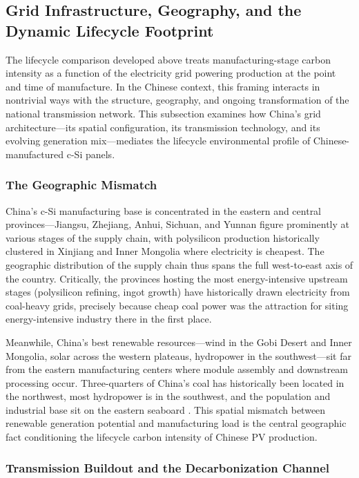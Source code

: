 \documentclass{article}
\begin{document}
\subsection{Grid Infrastructure, Geography, and the Dynamic Lifecycle Footprint}
 
The lifecycle comparison developed above treats manufacturing-stage carbon intensity as a function of the electricity grid powering production at the point and time of manufacture. In the Chinese context, this framing interacts in nontrivial ways with the structure, geography, and ongoing transformation of the national transmission network. This subsection examines how China's grid architecture---its spatial configuration, its transmission technology, and its evolving generation mix---mediates the lifecycle environmental profile of Chinese-manufactured c-Si panels.
 
\subsubsection{The Geographic Mismatch}
 
China's c-Si manufacturing base is concentrated in the eastern and central provinces---Jiangsu, Zhejiang, Anhui, Sichuan, and Yunnan figure prominently at various stages of the supply chain, with polysilicon production historically clustered in Xinjiang and Inner Mongolia where electricity is cheapest. The geographic distribution of the supply chain thus spans the full west-to-east axis of the country. Critically, the provinces hosting the most energy-intensive upstream stages (polysilicon refining, ingot growth) have historically drawn electricity from coal-heavy grids, precisely because cheap coal power was the attraction for siting energy-intensive industry there in the first place.
 
Meanwhile, China's best renewable resources---wind in the Gobi Desert and Inner Mongolia, solar across the western plateaus, hydropower in the southwest---sit far from the eastern manufacturing centers where module assembly and downstream processing occur. Three-quarters of China's coal has historically been located in the northwest, most hydropower is in the southwest, and the population and industrial base sit on the eastern seaboard \citep{eia_china}. This spatial mismatch between renewable generation potential and manufacturing load is the central geographic fact conditioning the lifecycle carbon intensity of Chinese PV production.
 
\subsubsection{Transmission Buildout and the Decarbonization Channel}
 
\end{document}
